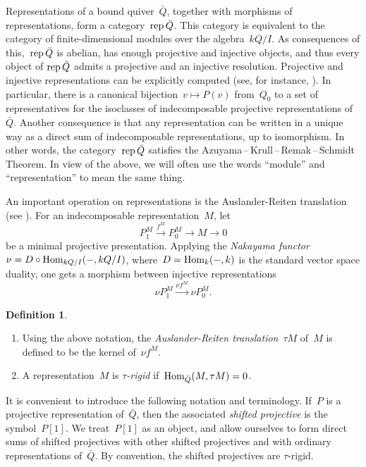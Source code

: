 \documentclass{amsart}
\theoremstyle{definition}
\newtheorem{definition}[theorem]{Definition}
\newcommand{\darkblue}{\color{darkblue}} %
\newcommand{\defn}[1]{\textsl{\darkblue #1}} %
\newcommand{\Hom}[1]{\operatorname{{\rm Hom}}_{#1}}
\newcommand{\rep}{\operatorname{{\rm rep}}}
\begin{document}
Representations of a bound quiver~$\bar Q$, together with morphisms of representations, form a category~$\rep \bar Q$.
This category is equivalent to the category of finite-dimensional modules over the algebra~$kQ/I$.
As consequences of this,~$\rep \bar Q$ is abelian, has enough projective and injective objects, and thus every object of $\rep \bar Q$ admits a projective and an injective resolution.
Projective and injective representations can be explicitly computed (see, for instance, \cite[Chapter III.2]{AssemSimsonSkowronski}).
In particular, there is a canonical bijection~$v\mapsto P(v)$ from~$Q_0$ to a set of representatives for the isoclasses of indecomposable projective representations of~$\bar Q$.
Another consequence is that any representation can be written in a unique way as a direct sum of indecomposable representations, up to isomorphism.
In other words, the category~$\rep \bar Q$ satisfies the \mbox{Azuyama\,--\,Krull\,--\,Remak\,--\,Schmidt} Theorem.
In view of the above, we will often use the words ``module'' and ``representation'' to mean the same thing.

An important operation on representations is the Auslander-Reiten translation (see \cite[Chap.~IV]{AssemSimsonSkowronski}).  For an indecomposable representation~$M$, let 
\[
 P_1^M \stackrel{f^M}{\to} P_0^M \to M \to 0 
\]
be a minimal projective presentation.  Applying the \defn{Nakayama functor}~$\nu = D\circ \Hom{kQ/I}(-, kQ/I)$, where~$D = \Hom{k}(-, k)$ is the standard vector space duality, one gets a morphism between injective representations
\[
\nu P_1^M \stackrel{\nu f^M}{\longrightarrow} \nu P_0^M.
\]
\begin{definition}
 \begin{enumerate}
  \item Using the above notation, the \defn{Auslander-Reiten translation}~$\tau M$ of~$M$ is defined to be the kernel of~$\nu f^M$.
  \item \cite{AdachiIyamaReiten} A representation~$M$ is \defn{$\tau$-rigid} if~$\Hom{\bar Q}(M, \tau M) = 0$.
 \end{enumerate}
\end{definition} 

It is convenient to introduce the following notation and terminology.  If~$P$ is a projective representation of~$\bar Q$, then the associated \defn{shifted projective} is the symbol~$P[1]$.  We treat~$P[1]$ as an object, and allow ourselves to form direct sums of shifted projectives with other shifted projectives and with ordinary representations of~$\bar Q$.  By convention, the shifted projectives are $\tau$-rigid.
\end{document}
